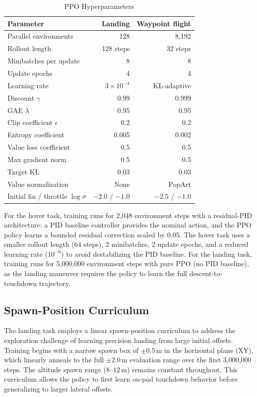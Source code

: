\documentclass[conference]{IEEEtran}
\begin{document}
\begin{table}[htbp]
\caption{PPO Hyperparameters}
\label{tab:ppo_params}
\centering
\begin{tabular}{lrr}
\toprule
\textbf{Parameter} & \textbf{Landing} & \textbf{Waypoint flight} \\
\midrule
Parallel environments & 128 & 8{,}192 \\
Rollout length & 128 steps & 32 steps \\
Minibatches per update & 8 & 8 \\
Update epochs & 4 & 4 \\
Learning rate & $3 \times 10^{-4}$ & KL-adaptive \\
Discount $\gamma$ & 0.99 & 0.999 \\
GAE $\lambda$ & 0.95 & 0.95 \\
Clip coefficient $\epsilon$ & 0.2 & 0.2 \\
Entropy coefficient & 0.005 & 0.002 \\
Value loss coefficient & 0.5 & 0.5 \\
Max gradient norm & 0.5 & 0.5 \\
Target KL & 0.03 & 0.03 \\
Value normalization & None & PopArt \\
Initial fin / throttle $\log\sigma$ & $-2.0$ / $-1.0$ & $-2.5$ / $-1.0$ \\
\bottomrule
\end{tabular}
\end{table}

For the hover task, training runs for 2{,}048 environment steps with a residual-PID architecture: a PID baseline controller provides the nominal action, and the PPO policy learns a bounded residual correction scaled by 0.05. The hover task uses a smaller rollout length (64 steps), 2 minibatches, 2 update epochs, and a reduced learning rate ($10^{-6}$) to avoid destabilizing the PID baseline. For the landing task, training runs for 5{,}000{,}000 environment steps with pure PPO (no PID baseline), as the landing maneuver requires the policy to learn the full descent-to-touchdown trajectory.

\subsection{Spawn-Position Curriculum}

The landing task employs a linear spawn-position curriculum to address the exploration challenge of learning precision landing from large initial offsets. Training begins with a narrow spawn box of $\pm 0.5$\,m in the horizontal plane (XY), which linearly anneals to the full $\pm 2.0$\,m evaluation range over the first 3{,}000{,}000 steps. The altitude spawn range ($8$--$12$\,m) remains constant throughout. This curriculum allows the policy to first learn on-pad touchdown behavior before generalizing to larger lateral offsets.
\end{document}
